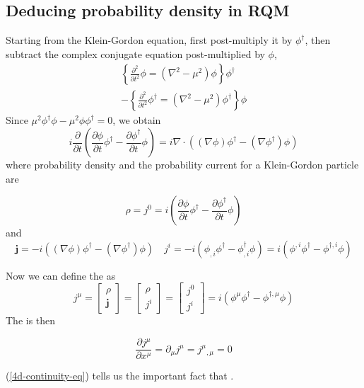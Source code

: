 \subsection{Deducing probability density in RQM}
Starting from the Klein-Gordon equation, first post-multiply it by $\phi^{\dagger}$, then subtract the complex conjugate equation post-multiplied by $\phi$,
\begin{equation}
\begin{array}{c}
{\left\{\frac{\partial^{2}}{\partial t^{2}} \phi=\left(\nabla^{2}-\mu^{2}\right) \phi\right\} \phi^{\dagger}} \\
{-\left\{\frac{\partial^{2}}{\partial t^{2}} \phi^{\dagger}=\left(\nabla^{2}-\mu^{2}\right) \phi^{\dagger}\right\} \phi}
\end{array}
\end{equation}
Since $\mu^{2} \phi^{\dagger} \phi-\mu^{2} \phi \phi^{\dagger}=0$, we obtain
\begin{equation}
i \frac{\partial}{\partial t}\left(\frac{\partial \phi}{\partial t} \phi^{\dagger}-\frac{\partial \phi^{\dagger}}{\partial t} \phi\right)=i \nabla \cdot\left((\nabla \phi) \phi^{\dagger}-\left(\nabla \phi^{\dagger}\right) \phi\right)
\end{equation}
where probability density and the probability current for a Klein-Gordon particle are
\begin{qt}
    \begin{equation}
\rho=j^{0}=i\left(\frac{\partial \phi}{\partial t} \phi^{\dagger}-\frac{\partial \phi^{\dagger}}{\partial t} \phi\right)
\end{equation}
and
\begin{equation}
\mathbf{j}=-i\left((\nabla \phi) \phi^{\dagger}-\left(\nabla \phi^{\dagger}\right) \phi\right) \quad j^{i}=-i\left(\phi_{,i} \phi^{\dagger}-\phi_{, i}^{\dagger} \phi\right)=i\left(\phi^{,i} \phi^{\dagger}-\phi^{\dagger, i} \phi\right)
\end{equation}
\end{qt}
Now we can define the  as
\begin{equation}
j^{\mu}=\left[\begin{array}{l}
{\rho} \\
{\mathbf{j}}
\end{array}\right]=\left[\begin{array}{l}
{\rho} \\
{j^{i}}
\end{array}\right]=\left[\begin{array}{l}
{j^{0}} \\
{j^{i}}
\end{array}\right]=i\left(\phi^{\mu} \phi^{\dagger}-\phi^{\dagger,\mu} \phi\right)
\end{equation}
The  is then
\begin{qt}
    \begin{equation}
\frac{\partial j^{\mu}}{\partial x^{\mu}}=\partial_{\mu} j^{\mu}=j^{\mu}{ }_{,\mu}=0
\label{4d-continuity-eq}
\end{equation}
\end{qt}
(\ref{4d-continuity-eq}) tells us the important fact that .

